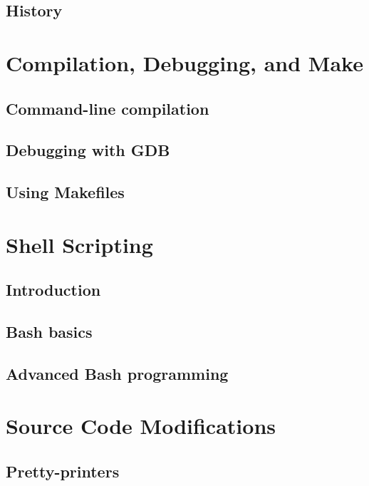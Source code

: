 \documentclass[11pt,twoside]{book}
\begin{document}
\section{History}



\chapter{Compilation, Debugging, and Make}

\section{Command-line compilation}

\section{Debugging with GDB}

\section{Using Makefiles}



\chapter{Shell Scripting}

\section{Introduction}

\section{Bash basics}

\section{Advanced Bash programming}



\chapter{Source Code Modifications}

\section{Pretty-printers}
\end{document}
